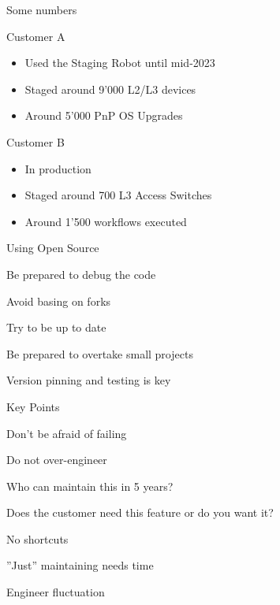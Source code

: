 \documentclass[aspectratio=169]{beamer}
\begin{document}


\begin{frame}{Some numbers}

  Customer A
  \begin{itemize}
    \item Used the Staging Robot until mid-2023
    \item Staged around 9'000 L2/L3 devices
    \item Around 5'000 PnP OS Upgrades
  \end{itemize}

  Customer B
  \begin{itemize}
    \item In production
    \item Staged around 700 L3 Access Switches
    \item Around 1'500 workflows executed
  \end{itemize}


\end{frame}



\begin{frame}{Using Open Source}

  \begin{vfilleditems}
    \item Be prepared to debug the code
    \item Avoid basing on forks
    \item Try to be up to date
    \item Be prepared to overtake small projects
    \item Version pinning and testing is key
  \end{vfilleditems}

\end{frame}


\begin{frame}{Key Points}

  \begin{vfilleditems}
    \item Don't be afraid of failing
    \item Do not over-engineer
    \item Who can maintain this in 5 years?
    \item Does the customer need this feature or do you want it?
    \item No shortcuts
    \item ''Just'' maintaining needs time
    \item Engineer fluctuation
  \end{vfilleditems}

\end{frame}
\end{document}
